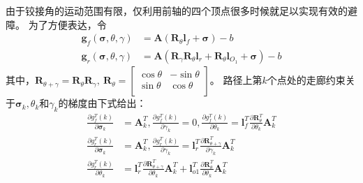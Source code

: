 \documentclass[master,academic]{ysuthesis} %
\begin{document}
		由于铰接角的运动范围有限，仅利用前轴的四个顶点很多时候就足以实现有效的避障。
		为了方便表达，令
		\begin{equation}
			\begin{aligned}
			\bm{g}_{f}\left( \bm{\sigma} ,\theta ,\gamma \right) &=\bm{A}\left( \bm{R}_{\theta}\bm{l}_f+\bm{\sigma} \right) -b\\
			\bm{g}_r\left( \bm{\sigma} ,\theta ,\gamma \right) &=\bm{A}\left( \bm{R}_{\gamma}\bm{R}_{\theta}\bm{l}_r+\bm{R}_{\theta}\bm{l}_{O_1}+\bm{\sigma} \right) -b
			\end{aligned}
		\end{equation}
		其中，$\bm{R}_{\theta +\gamma}=\bm{R}_{\theta}\bm{R}_{\gamma},\ \bm{R}_{\theta}=\left[ \begin{matrix}
			\cos\theta&		-\sin\theta\\
			\sin\theta&		\cos\theta\\
		\end{matrix} \right] $。
		路径上第$k$个点处的走廊约束关于$\bm{\sigma}_k,\theta_k$和$\gamma_k$的梯度由下式给出：
		\begin{equation}
			\begin{aligned}
			\frac{\partial g_{f}^{T}(k)}{\partial \bm{\sigma} _k}&=\bm{A}_{k}^{T},\frac{\partial g_{f}^{T}(k)}{\partial \gamma _k}=0,\frac{\partial g_{f}^{T}(k)}{\partial \theta _k}=\bm{l}_{f}^{T}\frac{\partial \bm{R}_{\theta}^{T}}{\partial \theta _k}\bm{A}_{k}^{T}\\
			\frac{\partial g_{r}^{T}(k)}{\partial \bm{\sigma} _k}&=\bm{A}_{k}^{T},\frac{\partial g_{r}^{T}(k)}{\partial \gamma _k}=\bm{l}_{r}^{T}\frac{\partial \bm{R}_{\theta +\gamma}^{T}}{\partial \gamma _k}\bm{A}_{k}^{T}\\
			\frac{\partial g_{r}^{T}(k)}{\partial \theta _k}&=\bm{l}_{r}^{T}\frac{\partial \bm{R}_{\theta +\gamma}^{T}}{\partial \theta _k}\bm{A}_{k}^{T}+\bm{l}_{o1}^{T}\frac{\partial \bm{R}_{\theta}^{T}}{\partial \theta _k}\bm{A}_{k}^{T}
			\end{aligned}
		\end{equation}
\end{document}
